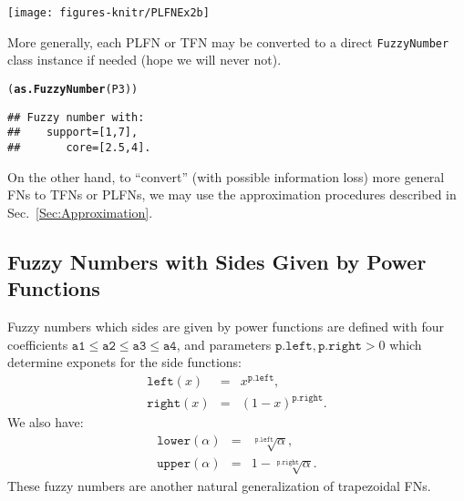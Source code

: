 \documentclass[11pt]{article}\usepackage{graphicx, color}
\makeatletter
\newcommand{\hlfunctioncall}[1]{\textcolor[rgb]{0.501960784313725,0,0.329411764705882}{\textbf{#1}}}%
\newenvironment{kframe}{%
 \def\at@end@of@kframe{}%
 \ifinner\ifhmode%
  \def\at@end@of@kframe{\end{minipage}}%
  \begin{minipage}{\columnwidth}%
 \fi\fi%
 \def\FrameCommand##1{\hskip\@totalleftmargin \hskip-\fboxsep
 \colorbox{shadecolor}{##1}\hskip-\fboxsep
     \hskip-\linewidth \hskip-\@totalleftmargin \hskip\columnwidth}%
 \MakeFramed {\advance\hsize-\width
   \@totalleftmargin\z@ \linewidth\hsize
   \@setminipage}}%
 {\par\unskip\endMakeFramed%
 \at@end@of@kframe}
\newenvironment{knitrout}{}{} %
\makeatother
\begin{document}
\begin{center}
\begin{knitrout}\small
{}\color{fgcolor}

{\centering \texttt{[image: figures-knitr/PLFNEx2b]} 

}



\end{knitrout}

\end{center}

\noindent
More generally, each PLFN or TFN may be converted
to a direct \texttt{FuzzyNumber} class instance if needed
(hope we will never not).

\begin{knitrout}\small
{}\color{fgcolor}\begin{kframe}
\begin{alltt}
(\hlfunctioncall{as.FuzzyNumber}(P3))
\end{alltt}
\begin{verbatim}
## Fuzzy number with:
##    support=[1,7],
##       core=[2.5,4].
\end{verbatim}
\end{kframe}
\end{knitrout}


On the other hand, to ``convert'' (with possible information loss)
more general FNs to TFNs or PLFNs, we may use the approximation
procedures described in Sec.~\ref{Sec:Approximation}.



\subsection{Fuzzy Numbers with Sides Given by Power Functions}\label{Sec:powerdef}

Fuzzy numbers which sides are given by power functions
are defined with four coefficients $\mathtt{a1}\le\mathtt{a2}\le\mathtt{a3}\le\mathtt{a4}$,
and parameters $\mathtt{p.left},\mathtt{p.right}>0$ which determine
exponets for the side functions:
\begin{eqnarray}
\mathtt{left}(x)&=&x^{\mathtt{p.left}},\\
\mathtt{right}(x)&=&(1-x)^{\mathtt{p.right}}.
\end{eqnarray}
We also have:
\begin{eqnarray}
\mathtt{lower}(\alpha)&=&\sqrt[\mathtt{p.left}]{\alpha},\\
\mathtt{upper}(\alpha)&=&1-\sqrt[\mathtt{p.right}]{\alpha}.
\end{eqnarray}
These fuzzy numbers are another natural generalization of trapezoidal FNs.
\end{document}
